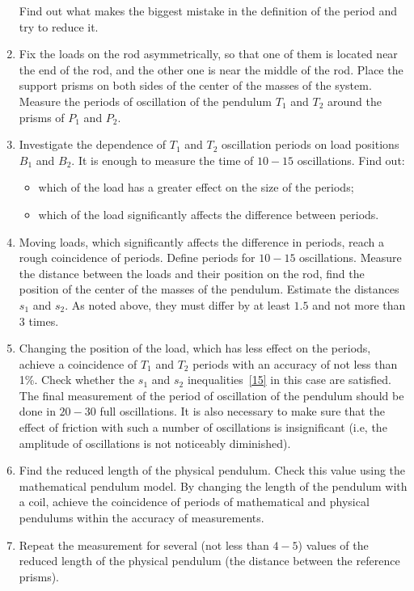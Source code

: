 \documentclass{LabWorkEng}
\begin{document}
\begin{enumerate}
	      Find out what makes the biggest mistake in the definition of the period and try to reduce it.
	\item Fix the loads on the rod asymmetrically, so that one of them is located near the end of the rod, and the other one is near the middle of the rod. Place the support prisms on both sides of the center of the masses of the system. Measure the periods of oscillation of the pendulum $T_1$ and $T_2$ around the prisms of $P_1$ and $P_2$.
	\item Investigate the dependence of $T_1$ and $T_2$ oscillation periods on load positions $B_1$ and $B_2$. It is enough to measure the time of $10-15$ oscillations. Find out:
	      \begin{itemize}
		      \item which of the load has a greater effect on the size of the periods;
		      \item which of the load significantly affects the difference between periods.
	      \end{itemize}
	\item Moving loads, which significantly affects the difference in periods, reach a rough coincidence of periods. Define periods for $10-15$ oscillations. Measure the distance between the loads and their position on the rod, find the position of the center of the masses of the pendulum. Estimate the distances $s_1$ and $s_2$. As noted above, they must differ by at least $1.5$ and not more than $3$ times.
	\item Changing the position of the load, which has less effect on the periods, achieve a coincidence of $T_1$ and $T_2$ periods with an accuracy of not less than 1\%. Check whether the $s_1$ and $s_2$ inequalities~\eqref{15} in this case are satisfied. The final measurement of the period of oscillation of the pendulum should be done in $20-30$ full oscillations. It is also necessary to make sure that the effect of friction with such a number of oscillations is insignificant (i.e, the amplitude of oscillations is not noticeably diminished).
	\item Find the reduced length of the physical pendulum. Check this value using the mathematical pendulum model. By changing the length of the pendulum with a coil, achieve the coincidence of periods of mathematical and physical pendulums within the accuracy of measurements.
	\item Repeat the measurement for several (not less than $4-5$) values of the reduced length of the physical pendulum (the distance between the reference prisms).
\end{enumerate}
\end{document}

